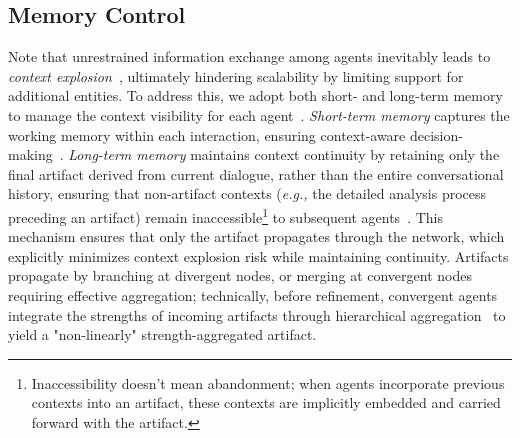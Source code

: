 \documentclass{article}
\newcommand{\eg}{\textit{e.g., }}
\begin{document}
\subsection{Memory Control}
Note that unrestrained information exchange among agents inevitably leads to \textit{context explosion}~\citep{Liu2024Autonomous,Xu2024Retrieval}, ultimately hindering scalability by limiting support for additional entities.
To address this, we adopt both short- and long-term memory to manage the context visibility for each agent~\citep{sumers2023cognitive}.
\textit{Short-term memory} captures the working memory within each interaction, ensuring context-aware decision-making~\citep{li2023camel}. 
\textit{Long-term memory} maintains context continuity by retaining only the final artifact derived from current dialogue, rather than the entire conversational history, ensuring that non-artifact contexts (\eg the detailed analysis process preceding an artifact) remain inaccessible\footnote{Inaccessibility doesn't mean abandonment; when agents incorporate previous contexts into an artifact, these contexts are implicitly embedded and carried forward with the artifact.} to subsequent agents~\citep{qian2023communicative}.
This mechanism ensures that only the artifact propagates through the network, which explicitly minimizes context explosion risk while maintaining continuity.
Artifacts propagate by branching at divergent nodes, or merging at convergent nodes requiring effective aggregation; technically, before refinement, convergent agents integrate the strengths of incoming artifacts through hierarchical aggregation~\citep{Du2024Multi} to yield a "non-linearly" strength-aggregated artifact.
\end{document}
